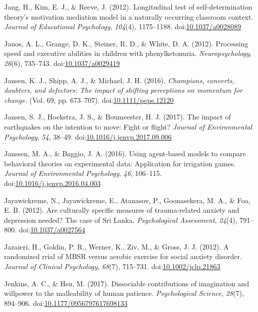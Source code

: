 \documentclass[english,man]{apa6}
\begin{document}
\hypertarget{ref-Jang2012}{}
Jang, H., Kim, E. J., \& Reeve, J. (2012). Longitudinal test of
self-determination theory's motivation mediation model in a naturally
occurring classroom context. \emph{Journal of Educational Psychology},
\emph{104}(4), 1175--1188.
doi:\href{https://doi.org/10.1037/a0028089}{10.1037/a0028089}

\hypertarget{ref-Janos2012}{}
Janos, A. L., Grange, D. K., Steiner, R. D., \& White, D. A. (2012).
Processing speed and executive abilities in children with
phenylketonuria. \emph{Neuropsychology}, \emph{26}(6), 735--743.
doi:\href{https://doi.org/10.1037/a0029419}{10.1037/a0029419}

\hypertarget{ref-Jansen2016}{}
Jansen, K. J., Shipp, A. J., \& Michael, J. H. (2016). \emph{Champions,
converts, doubters, and defectors: The impact of shifting perceptions on
momentum for change.} (Vol. 69, pp. 673--707).
doi:\href{https://doi.org/10.1111/peps.12120}{10.1111/peps.12120}

\hypertarget{ref-Jansen2017}{}
Jansen, S. J., Hoekstra, J. S., \& Boumeester, H. J. (2017). The impact
of earthquakes on the intention to move: Fight or flight? \emph{Journal
of Environmental Psychology}, \emph{54}, 38--49.
doi:\href{https://doi.org/10.1016/j.jenvp.2017.09.006}{10.1016/j.jenvp.2017.09.006}

\hypertarget{ref-Janssen2016}{}
Janssen, M. A., \& Baggio, J. A. (2016). Using agent-based models to
compare behavioral theories on experimental data: Application for
irrigation games. \emph{Journal of Environmental Psychology}, \emph{46},
106--115.
doi:\href{https://doi.org/10.1016/j.jenvp.2016.04.003}{10.1016/j.jenvp.2016.04.003}

\hypertarget{ref-Jayawickreme2012}{}
Jayawickreme, N., Jayawickreme, E., Atanasov, P., Goonasekera, M. A., \&
Foa, E. B. (2012). Are culturally specific measures of trauma-related
anxiety and depression needed? The case of Sri Lanka.
\emph{Psychological Assessment}, \emph{24}(4), 791--800.
doi:\href{https://doi.org/10.1037/a0027564}{10.1037/a0027564}

\hypertarget{ref-Jazaieri2012}{}
Jazaieri, H., Goldin, P. R., Werner, K., Ziv, M., \& Gross, J. J.
(2012). A randomized rrial of MBSR versus aerobic exercise for social
anxiety disorder. \emph{Journal of Clinical Psychology}, \emph{68}(7),
715--731.
doi:\href{https://doi.org/10.1002/jclp.21863}{10.1002/jclp.21863}

\hypertarget{ref-Jenkins2017}{}
Jenkins, A. C., \& Hsu, M. (2017). Dissociable contributions of
imagination and willpower to the malleability of human patience.
\emph{Psychological Science}, \emph{28}(7), 894--906.
doi:\href{https://doi.org/10.1177/0956797617698133}{10.1177/0956797617698133}
\end{document}
